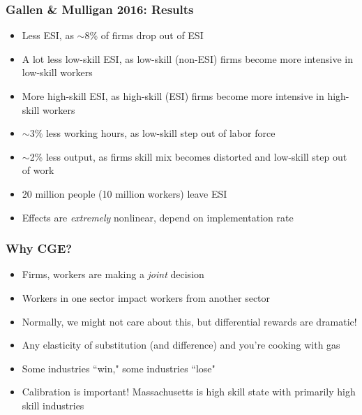 \documentclass{beamer}
\begin{document}
\begin{frame}
\frametitle[alignment=center]{Gallen \& Mulligan 2016: Results}
\begin{itemize}
\item Less ESI, as $\sim$8\% of firms drop out of ESI
\item A lot less low-skill ESI, as low-skill (non-ESI) firms become more intensive in low-skill workers
\item More high-skill ESI, as high-skill (ESI) firms become more intensive in high-skill workers
\item $\sim3\%$ less working hours, as low-skill step out of labor force
\item $\sim$2\% less output, as firms skill mix becomes distorted and low-skill step out of work
\item 20 million people (10 million workers) leave ESI
\item Effects are \emph{extremely} nonlinear, depend on implementation rate
\end{itemize}
\end{frame}


\begin{frame}
\frametitle[alignment=center]{Why CGE?}
\begin{itemize}
\item<1-> Firms, workers are making a \emph{joint} decision
\bigskip
\item<2-> Workers in one sector impact workers from another sector
\bigskip
\item<3-> Normally, we might not care about this, but differential rewards are dramatic!
\bigskip
\item<4-> Any elasticity of substitution (and difference) and you're cooking with gas
\bigskip
\item<5-> Some industries ``win," some industries ``lose"
\bigskip
\item<6-> Calibration is important!  Massachusetts is high skill state with primarily high skill industries
\end{itemize}
\end{frame}
\end{document}
